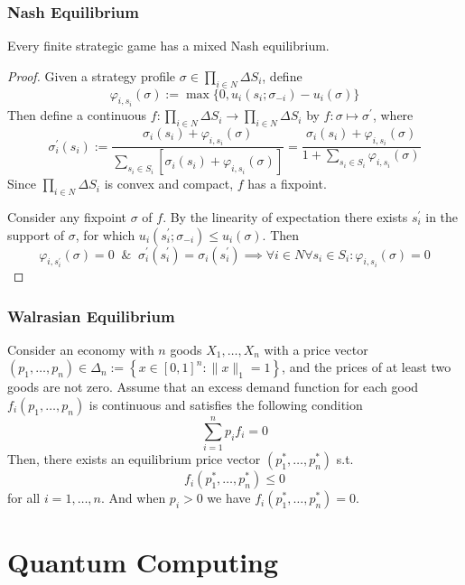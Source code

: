\documentclass[UTF8,aspectratio=43,11pt,colorlinks,compress,openany]{beamer}%
\begin{document}
\begin{frame}\frametitle{Nash Equilibrium}
\setlength\abovedisplayskip{0pt}
\setlength\belowdisplayskip{0pt}
\begin{theorem}
	Every finite strategic game has a mixed Nash equilibrium.
\end{theorem}
\begin{proof}
	Given a strategy profile $\sigma\in\prod\limits_{i\in N}\Delta S_i$, define
	\[\varphi_{i,s_i}(\sigma):=\max\big\{0,u_i(s_i;\sigma_{-i})-u_i(\sigma)\big\}\]
	Then define a continuous $f: \prod\limits_{i\in N}\Delta S_i\to\prod\limits_{i\in N}\Delta S_i$ by $f: \sigma\mapsto\sigma^\prime$, where
	\[
	\sigma_i^\prime(s_i):=\dfrac{\sigma_i(s_i)+\varphi_{i,s_i}(\sigma)}{\sum\limits_{s_i\in S_i}\left[\sigma_i(s_i)+\varphi_{i,s_i}(\sigma)\right]}=\dfrac{\sigma_i(s_i)+\varphi_{i,s_i}(\sigma)}{1+\sum\limits_{s_i\in S_i}\varphi_{i,s_i}(\sigma)}
	\]
	Since $\prod\limits_{i\in N}\Delta S_i$ is convex and compact, $f$ has a fixpoint.

	Consider any fixpoint $\sigma$ of $f$. By the linearity of expectation there exists $s_i^\prime$ in the support of $\sigma$, for which $u_i(s_i^\prime;\sigma_{-i})\leq u_i(\sigma)$. Then
	\[\varphi_{i,s_i^\prime}(\sigma)=0\;\;\&\;\;\sigma_i^\prime(s_i^\prime)=\sigma_i(s_i^\prime)\implies\forall i\in N\forall s_i\in S_i: \varphi_{i,s_i}(\sigma)=0\]
\end{proof}
\end{frame}

\begin{frame}\frametitle{Walrasian Equilibrium}
\begin{theorem}
Consider an economy with $n$ goods $X_1,\dots, X_n$ with a price vector $(p_1,\dots, p_n)\in\Delta_n:=\left\{x\in[0,1]^n:\|x\|_1=1\right\}$, and the prices of at least two goods are not zero. Assume that an excess demand function for each good $f_i(p_1,\dots, p_n)$ is continuous and satisfies the following condition
\[\sum\limits_{i=1}^n p_if_i=0\tag{Walras Law}\]
Then, there exists an equilibrium price vector $(p_1^*,\dots,p_n^*)$ s.t.
\[f_i(p_1^*,\dots,p_n^*)\leq 0\]
for all $i=1,\dots,n$. And when $p_i>0$ we have $f_i(p_1^*,\dots,p_n^*)=0$.
\end{theorem}
\end{frame}


\section{Quantum Computing}
\end{document}
